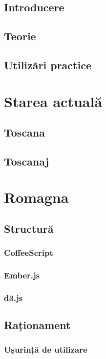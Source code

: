 \documentclass[12pt, a4paper, oneside, romanian]{teza-upb}
\begin{document}
  \section{Introducere}
  \section{Teorie}
  \section{Utilizări practice}

\chapter{Starea actuală}
  \section{Toscana}
  \section{Toscanaj}

\chapter{Romagna}
  \section{Structură}
    \subsection{CoffeeScript}
    \subsection{Ember.js}
    \subsection{d3.js}

  \section{Raționament}

    \subsection{Ușurință de utilizare}
\end{document}
